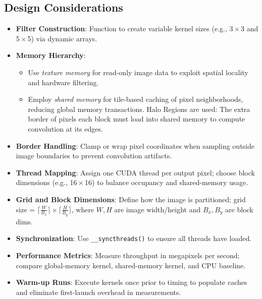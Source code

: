 \subsection{Design Considerations}
\begin{itemize}
  \item \textbf{Filter Construction}: Function to create variable kernel sizes (e.g., 3\,$\times$\,3 and 5\,$\times$\,5) via dynamic arrays.
  \item \textbf{Memory Hierarchy}:
    \begin{itemize}
      \item Use \emph{texture memory} for read-only image data to exploit spatial locality and hardware filtering.
      \item Employ \emph{shared memory} for tile-based caching of pixel neighborhoods, reducing global memory transactions. Halo Regions are used: The extra border of pixels each block must load into shared memory to compute convolution at its edges.
    \end{itemize}
  \item \textbf{Border Handling}: Clamp or wrap pixel coordinates when sampling outside image boundaries to prevent convolution artifacts.
  \item \textbf{Thread Mapping}: Assign one CUDA thread per output pixel; choose block dimensions (e.g., 16\,$\times$\,16) to balance occupancy and shared-memory usage.
  \item \textbf{Grid and Block Dimensions}: Define how the image is partitioned; grid size = $\bigl\lceil\frac{W}{B_x}\bigr\rceil\times\bigl\lceil\frac{H}{B_y}\bigr\rceil$, where $W,H$ are image width/height and $B_x,B_y$ are block dims.
  \item \textbf{Synchronization}: Use \texttt{\_\_syncthreads()} to ensure all threads have loaded.
  \item \textbf{Performance Metrics}: Measure throughput in megapixels per second; compare global-memory kernel, shared-memory kernel, and CPU baseline.
  \item \textbf{Warm-up Runs}: Execute kernels once prior to timing to populate caches and eliminate first-launch overhead in measurements.
\end{itemize}

